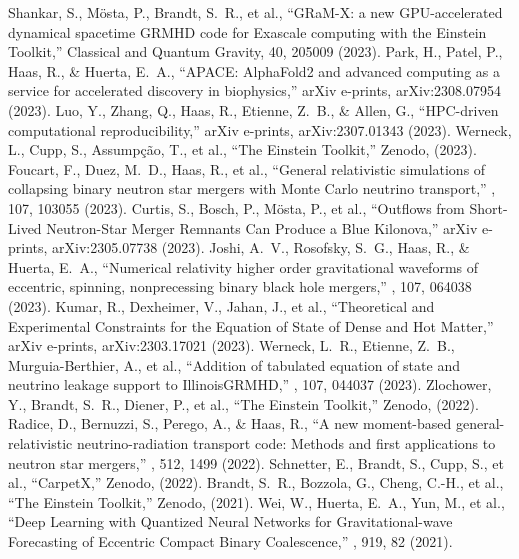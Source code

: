 Shankar, S., M{\"o}sta, P., Brandt, S.~R., et al., ``GRaM-X: a new GPU-accelerated dynamical spacetime GRMHD code for Exascale computing with the Einstein Toolkit,'' Classical and Quantum Gravity, 40, 205009 (2023).
 Park, H., Patel, P., Haas, R., \& Huerta, E.~A., ``APACE: AlphaFold2 and advanced computing as a service for accelerated discovery in biophysics,'' arXiv e-prints, arXiv:2308.07954 (2023).
 Luo, Y., Zhang, Q., Haas, R., Etienne, Z.~B., \& Allen, G., ``HPC-driven computational reproducibility,'' arXiv e-prints, arXiv:2307.01343 (2023).
 Werneck, L., Cupp, S., Assump{\c{c}}{\~a}o, T., et al., ``The Einstein Toolkit,'' Zenodo, (2023).
 Foucart, F., Duez, M.~D., Haas, R., et al., ``General relativistic simulations of collapsing binary neutron star mergers with Monte Carlo neutrino transport,'' \prd, 107, 103055 (2023).
 Curtis, S., Bosch, P., M{\"o}sta, P., et al., ``Outflows from Short-Lived Neutron-Star Merger Remnants Can Produce a Blue Kilonova,'' arXiv e-prints, arXiv:2305.07738 (2023).
 Joshi, A.~V., Rosofsky, S.~G., Haas, R., \& Huerta, E.~A., ``Numerical relativity higher order gravitational waveforms of eccentric, spinning, nonprecessing binary black hole mergers,'' \prd, 107, 064038 (2023).
 Kumar, R., Dexheimer, V., Jahan, J., et al., ``Theoretical and Experimental Constraints for the Equation of State of Dense and Hot Matter,'' arXiv e-prints, arXiv:2303.17021 (2023).
 Werneck, L.~R., Etienne, Z.~B., Murguia-Berthier, A., et al., ``Addition of tabulated equation of state and neutrino leakage support to IllinoisGRMHD,'' \prd, 107, 044037 (2023).
 Zlochower, Y., Brandt, S.~R., Diener, P., et al., ``The Einstein Toolkit,'' Zenodo, (2022).
 Radice, D., Bernuzzi, S., Perego, A., \& Haas, R., ``A new moment-based general-relativistic neutrino-radiation transport code: Methods and first applications to neutron star mergers,'' \mnras, 512, 1499 (2022).
 Schnetter, E., Brandt, S., Cupp, S., et al., ``CarpetX,'' Zenodo, (2022).
 Brandt, S.~R., Bozzola, G., Cheng, C.-H., et al., ``The Einstein Toolkit,'' Zenodo, (2021).
 Wei, W., Huerta, E.~A., Yun, M., et al., ``Deep Learning with Quantized Neural Networks for Gravitational-wave Forecasting of Eccentric Compact Binary Coalescence,'' \apj, 919, 82 (2021).
